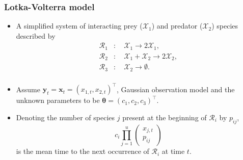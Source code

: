 \documentclass{beamer}
\newcommand{\bx}{\bm{x}}
\newcommand{\by}{\bm{y}}
\newcommand{\btheta}{\bm{\theta}}
\begin{document}
    \begin{frame}
    \frametitle{Lotka-Volterra model}
    \begin{itemize}
        \item A simplified system of interacting prey ($\mathcal{X}_1$) and predator ($\mathcal{X}_2$) species described by
        \begin{equation*}
        \begin{split}
        \mathcal{R}_1 &: \quad \mathcal{X}_1 \to 2 \mathcal{X}_1, \\
        \mathcal{R}_2 &: \quad \mathcal{X}_1 + \mathcal{X}_2 \to 2 \mathcal{X}_2, \\
        \mathcal{R}_3 &: \quad \mathcal{X}_2 \to \emptyset. \\
        \end{split}
        \end{equation*}
        \item Assume $\by_t = \bx_t = \left(x_{1,t}, x_{2,t}\right)^\intercal$, Gaussian observation model and the unknown parameters to be $\btheta = \left(c_1, c_2, c_3\right)^\intercal$.
        \item Denoting the number of species $j$ present at the beginning of $\mathcal{R}_i$ by $p_{ij}$,
        \begin{equation*}
            c_i \prod_{j=1}^{u} \begin{pmatrix}
            x_{j,t} \\
            p_{ij}
            \end{pmatrix}
        \end{equation*} is the mean time to the next occurrence of $\mathcal{R}_i$ at time $t$.
    \end{itemize}
    \end{frame}
\end{document}
